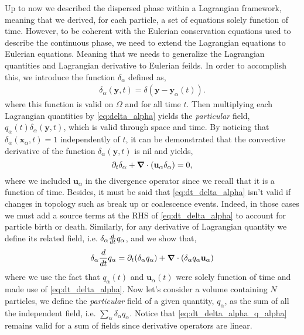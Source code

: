 Up to now we described the dispersed phase within a Lagrangian framework, meaning that we derived, for each particle, a set of equations solely function of time.
However, to be coherent with the Eulerian conservation equations used to describe the continuous phase, we need to extend the Lagrangian equations to Eulerian equations. 
Meaning that we needs to generalize the Lagrangian quantities and Lagrangian derivative to Eulerian feilds. 
In order to accomplish this, we introduce the function $\delta_\alpha$ defined as, 
\begin{align}
    \delta_\alpha(\textbf{y},t) = \delta(\textbf{y}-\textbf{y}_\alpha(t)).
    \label{eq:delta_alpha}
\end{align}
where this function is valid on $\Omega$ and for all time $t$\citep[Chapter 2]{morel2015mathematical}. 
Then multiplying each Lagrangian quantities by \ref{eq:delta_alpha} yields the \textit{particular} field, $q_\alpha(t)\delta_\alpha(\textbf{y},t)$, which is valid through space and time.
By noticing that $\delta_\alpha(\textbf{x}_\alpha,t) = 1$ independently of $t$, it can be demonstrated that the convective derivative of the function $\delta_\alpha(\textbf{y},t)$ is nil and yields, 
\begin{equation}
    \partial_t \delta_\alpha
    + \bm{\nabla} \cdot (\textbf{u}_\alpha  \delta_\alpha)
    =0,
    \label{eq:dt_delta_alpha}
\end{equation}
where we included $\textbf{u}_\alpha$ in the divergence operator since we recall that it is a function of time.
Besides, it must be said that \ref{eq:dt_delta_alpha} isn't valid if changes in topology such as break up or coalescence events.
Indeed, in those cases we must add a source terms at the RHS of \ref{eq:dt_delta_alpha} to account for particle birth or death. 
Similarly, for any derivative of Lagrangian quantity we define its related field, i.e. $\delta_\alpha \frac{d}{d t} q_\alpha$, and we show that,
\begin{equation}
    \delta_\alpha \frac{d}{d t} q_\alpha
    = \partial_t (\delta_\alpha q_\alpha)
    + \bm{\nabla} \cdot (\delta_\alpha q_\alpha \textbf{u}_\alpha)
    \label{eq:dt_delta_alpha_q_alpha}
\end{equation}
where we use the fact that $q_\alpha(t)$ and $\textbf{u}_\alpha(t)$ were solely function of time and made use of \ref{eq:dt_delta_alpha}.
Now let's consider a volume containing $N$ particles, we define the \textit{particular} field of a given quantity, $q_\alpha$, as the sum of all the independent field, i.e. $\sum_\alpha \delta_\alpha q_\alpha$.
Notice that \ref{eq:dt_delta_alpha_q_alpha} remains valid for a sum of fields since derivative operators are linear.
